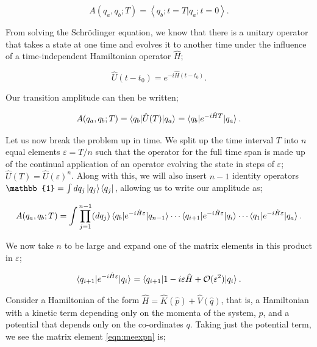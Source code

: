 \begin{equation}
A(q_a, q_b; T) = \left < q_b; t=T| q_a; t=0 \right >.
\end{equation}

From solving the Schr\"{o}dinger equation, we know that there is a unitary operator that takes a state at one time and evolves it to another time under the influence of a time-independent Hamiltonian operator $\hat{H}$;

\begin{equation}
\hat{U}(t-t_0) = e^{-i \hat{H}(t-t_0)}.
\end{equation}

Our transition amplitude can then be written;

\begin{equation}
A(q_a, q_b; T) = \mathinner{\langle q_b\vert\hat{U}(T)\vert q_a\rangle}_{} = \mathinner{\langle q_b\vert e^{-i \hat{H}T}\vert q_a\rangle}_{}.
\end{equation} 

Let us now break the problem up in time. We split up the time interval $T$ into $n$ equal elements $\varepsilon = T/n$ such that the operator for the full time span is made up of the continual application of an operator evolving the state in steps of $\varepsilon$; $\hat{U}(T) = \hat{U}(\varepsilon)^n$. Along with this, we will also insert $n-1$ identity operators $\mathbb{1} = \int dq_j \ket{q_j} \bra{q_j}$, allowing us to write our amplitude as;

\begin{equation}
\label{eqn:generalamp}
A(q_a, q_b;T) = \int \prod_{j=1}^{n-1} (dq_j) \mathinner{\langle q_b\vert e^{-i \hat{H} \varepsilon}\vert q_{n-1}\rangle}_{} \cdots \mathinner{\langle q_{i+1}\vert e^{-i \hat{H} \varepsilon}\vert q_{i}\rangle}_{} \cdots \mathinner{\langle q_1\vert e^{-i \hat{H} \varepsilon}\vert q_a\rangle}_{}.\end{equation}

We now take $n$ to be large and expand one of the matrix elements in this product in $\varepsilon$;

\begin{equation}
\label{eqn:meexpn}
\mathinner{\langle q_{i+1}\vert e^{-i \hat{H} \varepsilon}\vert q_i\rangle}_{} = \mathinner{\langle q_{i+1}\vert1 - i \varepsilon \hat{H} + \mathcal{O}(\varepsilon^2)\vert q_i\rangle}_{}.
\end{equation}

Consider a Hamiltonian of the form $\hat{H} = \hat{K}(\hat{p}) + \hat{V}(\hat{q})$, that is, a Hamiltonian with a kinetic term depending only on the momenta of the system, $p$, and a potential that depends only on the co-ordinates $q$. Taking just the potential term, we see the matrix element \ref{eqn:meexpn} is;

